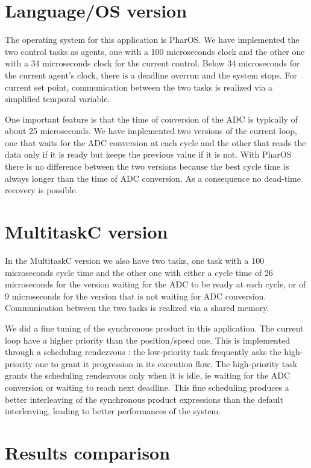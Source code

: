 \documentclass[10pt]{report}
\begin{document}
\section{Language/OS version}

The operating system for this application is PharOS. We have implemented the two control tasks as agents,
one with a 100 microseconds clock and the other one with a 34 microseconds clock for the current control. 
Below 34 microseconds for the current agent's clock, there is a deadline overrun and the system stops. 
For current set point, communication between the two tasks is realized via a simplified temporal variable.

One important feature is that the time of conversion of the ADC is typically of about 25 microseconds. We
have implemented two versions of the current loop, one that waits for the ADC conversion at each cycle
and the other that reads the data only if it is ready but keeps the previous value if it is not. With
PharOS there is no difference between the two versions because the best cycle time is always longer than
the time of ADC conversion. As a consequence no dead-time recovery is possible.

\section{MultitaskC version}

In the MultitaskC version we also have two tasks, one task with a 100 microseconds cycle time and the other one
with either a cycle time of 26 microseconds for the version waiting for the ADC to be ready at each cycle, or 
of 9 microseconds for the version that is not waiting for ADC conversion. Communication between the two
tasks is realized via a shared memory.

We did a fine tuning of the synchronous product in this application. The current loop have a higher priority
than the position/speed one. This is implemented through a scheduling rendezvous : the low-priority task frequently 
asks the high-priority one to grant it progression in its execution flow. The high-priority task grants the scheduling 
rendezvous only when it is idle, ie waiting for the ADC conversion or waiting to reach next deadline. 
This fine scheduling produces a better interleaving of the synchronous product expressions than the default interleaving, 
leading to better performances of the system.

\section{Results comparison}
\end{document}
